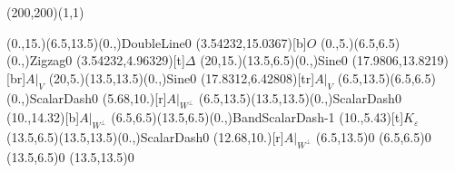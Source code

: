\unitlength=1bp%

\begin{feynartspicture}(200,200)(1,1)

\FADiagram{}
\FAProp(0.,15.)(6.5,13.5)(0.,){DoubleLine}{0}
\FALabel(3.54232,15.0367)[b]{$O$}
\FAProp(0.,5.)(6.5,6.5)(0.,){Zigzag}{0}
\FALabel(3.54232,4.96329)[t]{$\Delta$}
\FAProp(20,15.)(13.5,6.5)(0.,){Sine}{0}
\FALabel(17.9806,13.8219)[br]{$A|_V$}
\FAProp(20,5.)(13.5,13.5)(0.,){Sine}{0}
\FALabel(17.8312,6.42808)[tr]{$A|_V$}
\FAProp(6.5,13.5)(6.5,6.5)(0.,){ScalarDash}{0}
\FALabel(5.68,10.)[r]{$A|_{W^\perp}$}
\FAProp(6.5,13.5)(13.5,13.5)(0.,){ScalarDash}{0}
\FALabel(10.,14.32)[b]{$A|_{W^\perp}$}
\FAProp(6.5,6.5)(13.5,6.5)(0.,){BandScalarDash}{-1}
\FALabel(10.,5.43)[t]{$K_\varepsilon$}
\FAProp(13.5,6.5)(13.5,13.5)(0.,){ScalarDash}{0}
\FALabel(12.68,10.)[r]{$A|_{W^\perp}$}
\FAVert(6.5,13.5){0}
\FAVert(6.5,6.5){0}
\FAVert(13.5,6.5){0}
\FAVert(13.5,13.5){0}
\end{feynartspicture}

